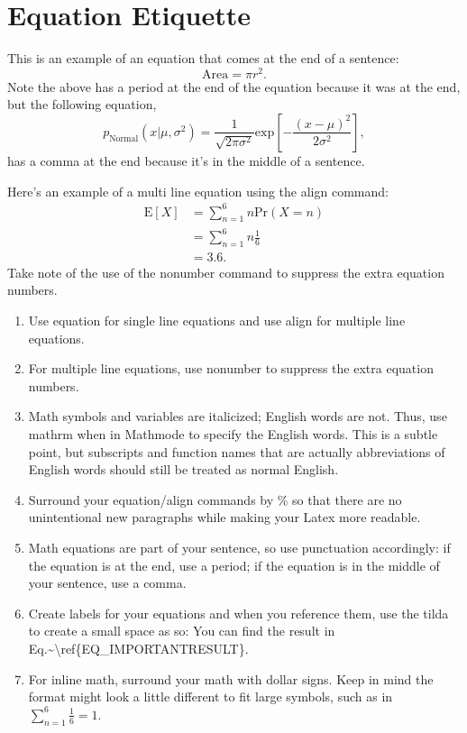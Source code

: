 \chapter{Equation Etiquette}\label{Ch:equation_etiquette}

This is an example of an equation that comes at the end of a sentence:
%
\begin{equation}
    \mathrm{Area} = \pi r^2.
\end{equation}
%
Note the above has a period at the end of the equation because it was at the end, but the following equation,
%
\begin{equation}
    p_{\mathrm{Normal}}(x\vert \mu, \sigma^2) = \frac{1}{\sqrt{2 \pi \sigma^2}}\mathrm{exp}\left[-\frac{(x - \mu)^2}{2 \sigma^2}\right],
\end{equation}
%
has a comma at the end because it's in the middle of a sentence.

Here's an example of a multi line equation using the align command:
%
\begin{align}
    \mathrm{E}[X] &= \sum_{n=1}^{6} n \mathrm{Pr}(X=n)\nonumber\\
    &= \sum_{n=1}^{6} n \frac{1}{6}\nonumber\\
    &= 3.6.
\end{align}
%
Take note of the use of the nonumber command to suppress the extra equation numbers.


\begin{enumerate}{}
\item Use equation for single line equations and use align for multiple line equations.
\item For multiple line equations, use nonumber to suppress the extra equation numbers.
\item Math symbols and variables are italicized; English words are not. Thus, use mathrm when in Mathmode to specify the English words. This is a subtle point, but subscripts and function names that are actually abbreviations of English words should still be treated as normal English.
\item Surround your equation/align commands by \% so that there are no unintentional new paragraphs while making your Latex more readable.
\item Math equations are part of your sentence, so use punctuation accordingly: if the equation is at the end, use a period; if the equation is in the middle of your sentence, use a comma.
\item Create labels for your equations and when you reference them, use the tilda to create a small space as so: You can find the result in Eq.\textasciitilde\textbackslash ref\{EQ\_IMPORTANTRESULT\}.
\item For inline math, surround your math with dollar signs. Keep in mind the format might look a little different to fit large symbols, such as in $\sum_{n=1}^{6} \frac{1}{6} = 1$.
\end{enumerate}


\endinput
